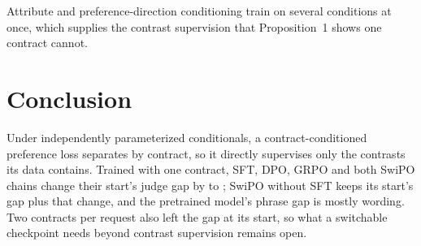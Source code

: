 \documentclass[letterpaper]{article} %
\begin{document}
Attribute and preference-direction conditioning \cite{dong2023steerlm,wang-etal-2024-arithmetic} train on several conditions at once, which supplies the contrast supervision that Proposition~1 shows one contract cannot. 


\section{Conclusion}

Under independently parameterized conditionals, a contract-conditioned preference loss separates by contract, so it directly supervises only the contrasts its data contains. Trained with one contract, SFT, DPO, GRPO and both SwiPO chains change their start's judge gap by \nJudgeStepLo{} to \nJudgeStepHi{}; SwiPO without SFT keeps its start's gap plus that change, and the pretrained model's phrase gap is mostly wording. Two contracts per request also left the gap at its start, so what a switchable checkpoint needs beyond contrast supervision remains open.

{\small

}
\end{document}
